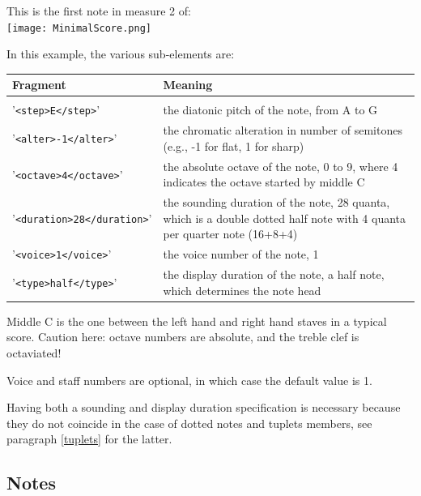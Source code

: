 \documentclass[12pt,a4paper]{article}
\begin{document}
This is the first note in measure 2 of:\\
\texttt{[image: MinimalScore.png]}

In this example, the various sub-elements are:
\begin{center}
\footnotesize
\def \contentsWidth{0.5\textwidth}
\def \arraystretch{1.3}
%
\begin{tabular}[t]{lp{\contentsWidth}}
\textbf{Fragment}&\textbf{Meaning} \tabularnewline[0.5ex]
\hline\\[-3.0ex]
%
{'\tt <step>E</step>}' & the diatonic pitch of the note, from A to G
\tabularnewline

{'\tt <alter>-1</alter>}' & the chromatic alteration in
	number of semitones (e.g., -1 for flat, 1 for sharp)
\tabularnewline

{'\tt <octave>4</octave>}' & the absolute octave of the note, 0 to 9, where 4 indicates the octave
	started by middle C
\tabularnewline

{'\tt <duration>28</duration>}' & the sounding duration of the note, 28 quanta, which is a double dotted half note with 4 quanta per quarter note (16+8+4)
\tabularnewline

{'\tt <voice>1</voice>}' & the voice number of the note, 1
\tabularnewline

{'\tt <type>half</type>}' & the display duration of the note, a half note, which determines the note head
\tabularnewline

\end{tabular}
\end{center}

Middle C is the one between the left hand and right hand staves in a typical score. Caution here: octave numbers are absolute, and the treble clef is octaviated!

Voice and staff numbers are optional, in which case the default value is 1.

Having both a sounding and display duration specification is necessary because they do not coincide in the case of dotted notes and tuplets members, see paragraph \ref{tuplets} for the latter.

\subsection{Notes}
\end{document}
